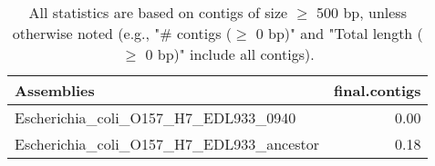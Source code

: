 \documentclass[12pt,a4paper]{article}
\begin{document}
\begin{table}[ht]
\begin{center}
\caption{All statistics are based on contigs of size $\geq$ 500 bp, unless otherwise noted (e.g., "\# contigs ($\geq$ 0 bp)" and "Total length ($\geq$ 0 bp)" include all contigs).}
\begin{tabular}{|l*{1}{|r}|}
\hline
Assemblies & final.contigs \\ \hline
Escherichia\_coli\_O157\_H7\_EDL933\_0940 & 0.00 \\ \hline
Escherichia\_coli\_O157\_H7\_EDL933\_ancestor & 0.18 \\ \hline
\end{tabular}
\end{center}
\end{table}
\end{document}
